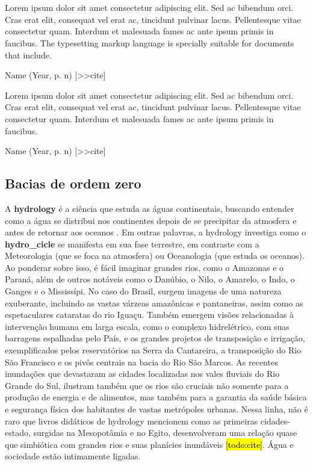 \documentclass[./main.tex]{subfiles}
\begin{document}
\chapter{\chapHydro} \label{chap:hydrology}

\setlength{\parskip}{0mm}

\epigraph{\small{Lorem ipsum dolor sit amet consectetur adipiscing elit. Sed ac bibendum orci. Cras erat elit, consequat vel erat ac, tincidunt pulvinar lacus. Pellentesque vitae consectetur quam. Interdum et malesuada fames ac ante ipsum primis in faucibus. The typesetting markup language is specially suitable for documents that include.}}{Name (Year, p. n) [>>cite]}

\epigraph{\small{Lorem ipsum dolor sit amet consectetur adipiscing elit. Sed ac bibendum orci. Cras erat elit, consequat vel erat ac, tincidunt pulvinar lacus. Pellentesque vitae consectetur quam. Interdum et malesuada fames ac ante ipsum primis in faucibus.}}{Name (Year, p. n) [>>cite]}

\setlength{\parskip}{\myparskip}

\section{Bacias de ordem zero} \label{sec:hydro:intro}

\par A \textbf{\gls{hydrology}} é a ciência que estuda as águas continentais, buscando entender como a água se distribui nos continentes depois de se precipitar da atmosfera e antes de retornar aos oceanos \cite{chow1964}. Em outras palavras, a \gls{hydrology} investiga como o \textbf{\gls{hydro_cicle}} se manifesta em sua fase terrestre, em contraste com a Meteorologia (que se foca na atmosfera) ou Oceanologia (que estuda os oceanos). Ao ponderar sobre isso, é fácil imaginar grandes rios, como o Amazonas e o Paraná, além de outros notáveis como o Danúbio, o Nilo, o Amarelo, o Indo, o Ganges e o Mississípi. No caso do Brasil, surgem imagens de uma natureza exuberante, incluindo as vastas várzeas amazônicas e pantaneiras, assim como as espetaculares cataratas do rio Iguaçu. Também emergem visões relacionadas à intervenção humana em larga escala, como o complexo hidrelétrico, com suas barragens espalhadas pelo País, e os grandes projetos de transposição e irrigação, exemplificados pelos reservatórios na Serra da Cantareira, a transposição do Rio São Francisco e os pivôs centrais na bacia do Rio São Marcos. As recentes inundações que devastaram as cidades localizadas nos vales fluviais do Rio Grande do Sul, ilustram também que os rios são cruciais não somente para a produção de energia e de alimentos, mas também para a garantia da saúde básica e segurança física dos habitantes de vastas metrópoles urbanas. Nessa linha, não é raro que livros didáticos de \gls{hydrology} mencionem como as primeiras cidades-estado, surgidas na Mesopotâmia e no Egito, desenvolveram uma relação quase que simbiótica com grandes rios e suas planícies inundáveis \hl{[todo:cite]}. Água e sociedade estão intimamente ligadas. 
\end{document}
